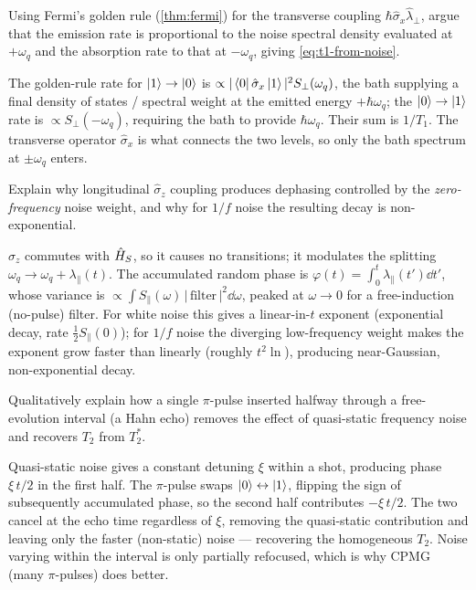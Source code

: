 \begin{exercise}
Using Fermi's golden rule (\cref{thm:fermi}) for the transverse
coupling $\hbar\hat\sigma_x\hat\lambda_\perp$, argue that the
emission rate is proportional to the noise spectral density
evaluated at $+\omega_q$ and the absorption rate to that at
$-\omega_q$, giving \cref{eq:t1-from-noise}.
\begin{solution}
The golden-rule rate for $\ket1\to\ket0$ is
$\propto|\bra0\hat\sigma_x\ket1|^2 S_\perp(\omega_q)$, the bath
supplying a final density of states / spectral weight at the
emitted energy $+\hbar\omega_q$; the $\ket0\to\ket1$ rate is
$\propto S_\perp(-\omega_q)$, requiring the bath to provide
$\hbar\omega_q$. Their sum is $1/T_1$. The transverse operator
$\hat\sigma_x$ is what connects the two levels, so only the bath
spectrum at $\pm\omega_q$ enters.
\end{solution}
\end{exercise}

\begin{exercise}
Explain why longitudinal $\hat\sigma_z$ coupling produces dephasing
controlled by the \emph{zero-frequency} noise weight, and why for
$1/f$ noise the resulting decay is non-exponential.
\begin{solution}
$\hat\sigma_z$ commutes with $\hat{H}_S$, so it causes no transitions;
it modulates the splitting $\omega_q\to\omega_q+\lambda_\parallel(t)$.
The accumulated random phase is
$\varphi(t)=\int_0^t\lambda_\parallel(t')\dd t'$, whose variance is
$\propto\int S_\parallel(\omega)\,|\,\text{filter}\,|^2\dd\omega$,
peaked at $\omega\to0$ for a free-induction (no-pulse) filter. For
white noise this gives a linear-in-$t$ exponent (exponential decay,
rate $\tfrac12 S_\parallel(0)$); for $1/f$ noise the diverging
low-frequency weight makes the exponent grow faster than linearly
(roughly $t^2\ln$), producing near-Gaussian, non-exponential decay.
\end{solution}
\end{exercise}

\begin{exercise}
Qualitatively explain how a single $\pi$-pulse inserted halfway
through a free-evolution interval (a Hahn echo) removes the effect
of quasi-static frequency noise and recovers $T_2$ from $T_2^*$.
\begin{solution}
Quasi-static noise gives a constant detuning $\xi$ within a shot,
producing phase $\xi\,t/2$ in the first half. The $\pi$-pulse swaps
$\ket0\leftrightarrow\ket1$, flipping the sign of subsequently
accumulated phase, so the second half contributes $-\xi\,t/2$. The
two cancel at the echo time regardless of $\xi$, removing the
quasi-static contribution and leaving only the faster (non-static)
noise --- recovering the homogeneous $T_2$. Noise varying within
the interval is only partially refocused, which is why CPMG (many
$\pi$-pulses) does better.
\end{solution}
\end{exercise}

